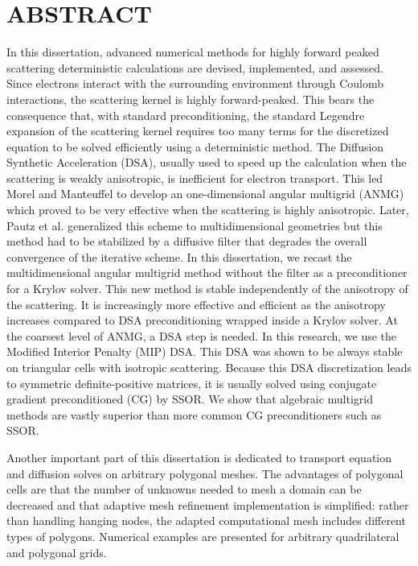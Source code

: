 \chapter*{ABSTRACT}
\pagestyle{plain}
\setcounter{page}{2}
\indent In this dissertation, advanced numerical methods for highly forward
peaked scattering deterministic calculations are devised, implemented, and
assessed. Since electrons interact with the surrounding environment through
Coulomb interactions, the scattering kernel is highly forward-peaked. 
This bears the consequence that, with standard preconditioning, the standard Legendre
expansion of the scattering kernel requires too many terms for the discretized
equation to be solved efficiently using a deterministic method. The Diffusion
Synthetic Acceleration (DSA), usually used to speed up the calculation when
the scattering is weakly anisotropic, is inefficient for electron transport.
This led Morel and Manteuffel to develop an one-dimensional angular multigrid
(ANMG) which proved to be very effective when the scattering is highly
anisotropic. Later, Pautz et al. generalized this scheme to multidimensional
geometries but this method had to be stabilized by a diffusive filter that
degrades the overall convergence of the iterative scheme. In this dissertation, we
recast the multidimensional angular multigrid method without the filter as a
preconditioner for a Krylov solver. This new method is stable independently of
the anisotropy of the scattering. It is increasingly more effective and
efficient as the anisotropy increases compared to DSA preconditioning wrapped
inside a Krylov solver. At the coarsest level of ANMG, a DSA step is needed. In
this research, we use the Modified Interior Penalty (MIP) DSA. This DSA was
shown to be always stable on triangular cells with isotropic scattering. 
Because this DSA discretization leads to symmetric definite-positive matrices, 
it is usually solved using conjugate gradient preconditioned (CG) by SSOR. 
We show that algebraic multigrid methods are vastly superior than more common
CG preconditioners such as SSOR.

Another important part of this dissertation is dedicated to transport 
equation and diffusion solves on arbitrary polygonal meshes. The advantages of
polygonal cells are that the number of unknowns needed to mesh a domain can be
decreased and that adaptive mesh refinement implementation is simplified:
rather than handling hanging nodes, the adapted computational mesh includes 
different types of polygons. Numerical examples are presented for arbitrary
quadrilateral and polygonal grids.
\pagebreak{}
